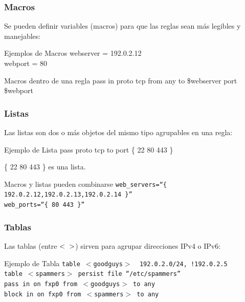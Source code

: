 \documentclass{beamer}
\begin{document}
\begin{frame}
\frametitle{Macros}

Se pueden definir variables (\alert{macros}) para que las reglas sean más legibles y 
manejables:

\begin{block}{Ejemplos de Macros}
webserver = 192.0.2.12 \\
webport = 80
\end{block}

\begin{block}{Macros dentro de una regla}
pass in proto tcp from any to \alert{\$webserver} port \alert{\$webport}
\end{block}

\end{frame}


\begin{frame}
\frametitle{Listas}

Las listas son dos o más objetos del mismo tipo agrupables en una regla:

\begin{block}{Ejemplo de Lista}
pass proto tcp to port \{ 22 80 443 \}
\end{block}

\{ 22 80 443 \} es una \alert{lista}.

\begin{block}{Macros y listas pueden combinarse}
\texttt{web\_servers=``\{ 192.0.2.12,192.0.2.13,192.0.2.14 \}''} \\
\texttt{web\_ports=``\{ 80 443 \}''}
\end{block}

\end{frame}


\begin{frame}
\frametitle{Tablas}

Las tablas (entre $< \hspace{2mm} >$) sirven para agrupar direcciones IPv4 o IPv6:

\begin{block}{Ejemplo de Tabla}
\tt table $<$goodguys$>$ { 192.0.2.0/24, !192.0.2.5 } \\
table $<$spammers$>$ persist file ``/etc/spammers'' \\
pass  in on fxp0 from \alert{$<$goodguys$>$} to any \\
block in on fxp0 from \alert{$<$spammers$>$} to any
\end{block}

\end{frame}
\end{document}

